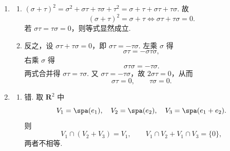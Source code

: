 \begin{enumerate}
    设 $A=\begin{pmatrix}a&b\\c&d\end{pmatrix}$，则
    \[
        \varphi(A)=\begin{pmatrix}2(a+c)&b+d\\2(a+c)&b+d\end{pmatrix}.
    \]
    其像空间由
    \[
        \begin{pmatrix}2&0\\2&0\end{pmatrix},\qquad
        \begin{pmatrix}0&1\\0&1\end{pmatrix}
    \]
    张成，故 $r(\varphi)=2$. 又 $\varphi(A)=0$ 等价于
    \[
        a+c=0,\qquad b+d=0,
    \]
    故
    \[
        \ker\varphi
        =\spa\left\{\begin{pmatrix}1&0\\-1&0\end{pmatrix},
        \begin{pmatrix}0&1\\0&-1\end{pmatrix}\right\},
    \]
        维数为 $2$.

    \item
    \begin{enumerate}
        \item $(\sigma+\tau)^2=\sigma^2+\sigma\tau+\tau\sigma+\tau^2
        =\sigma+\tau+\sigma\tau+\tau\sigma$. 故
        \[
            (\sigma+\tau)^2=\sigma+\tau
            \iff \sigma\tau+\tau\sigma=0.
        \]
        若 $\sigma\tau=\tau\sigma=0$，则等式显然成立.

        \item 反之，设 $\sigma\tau+\tau\sigma=0$，即 $\sigma\tau=-\tau\sigma$. 左乘 $\sigma$ 得
        \[
            \sigma\tau=-\sigma\tau\sigma,
        \]
        右乘 $\sigma$ 得
        \[
            \sigma\tau\sigma=-\tau\sigma.
        \]
        两式合并得 $\sigma\tau=\tau\sigma$. 又 $\sigma\tau=-\tau\sigma$，故 $2\sigma\tau=0$，从而
        \[
            \sigma\tau=0,\qquad \tau\sigma=0.
        \]
    \end{enumerate}

    \item
    \begin{enumerate}
        \item 错. 取 $\mathbf{R}^2$ 中
        \[
            V_1=\spa(e_1),\quad V_2=\spa(e_2),\quad V_3=\spa(e_1+e_2).
        \]
        则
        \[
            V_1\cap(V_2+V_3)=V_1,
            \qquad
            V_1\cap V_2+V_1\cap V_3=\{0\},
        \]
        两者不相等.


\end{enumerate}
\end{enumerate}
